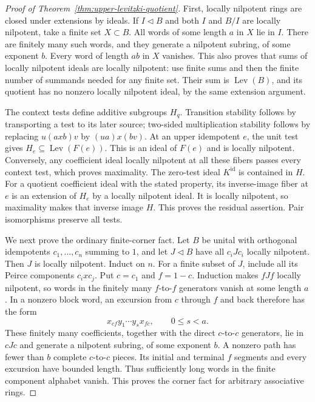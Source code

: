 \begin{proof}[Proof of Theorem~\ref{thm:upper-levitzki-quotient}]
First, locally nilpotent rings are closed under extensions by ideals.
If $I\lhd B$ and both $I$ and $B/I$ are locally nilpotent, take a finite
set $X\subset B$. All words of some length $a$ in $X$ lie in $I$.
There are finitely many such words, and they generate a nilpotent
subring, of some exponent $b$. Every word of length $ab$ in $X$
vanishes. This also proves that sums of locally nilpotent ideals are
locally nilpotent: use finite sums and then the finite number of
summands needed for any finite set. Their sum is
$\operatorname{Lev}(B)$, and its quotient has no nonzero locally
nilpotent ideal, by the same extension argument.

The context tests define additive subgroups $H_q$. Transition
stability follows by transporting a test to its later source;
two-sided multiplication stability follows by replacing
$u(axb)v$ by $(ua)x(bv)$. At an upper idempotent $e$, the unit test
gives $H_e\subseteq\operatorname{Lev}(F(e))$. This is an ideal of
$F(e)$ and is locally nilpotent. Conversely, any coefficient ideal
locally nilpotent at all these fibers passes every context test, which
proves maximality. The zero-test ideal $K^{\mathrm{id}}$ is contained
in $H$. For a quotient coefficient ideal with the stated property,
its inverse-image fiber at $e$ is an extension of $H_e$ by a locally
nilpotent ideal. It is locally nilpotent, so maximality makes that
inverse image $H$. This proves the residual assertion. Pair
isomorphisms preserve all tests.

We next prove the ordinary finite-corner fact. Let $B$ be unital with
orthogonal idempotents $c_1,\ldots,c_n$ summing to $1$, and let
$J\lhd B$ have all $c_iJc_i$ locally nilpotent. Then $J$ is locally
nilpotent. Induct on $n$. For a finite subset of $J$, include all its
Peirce components $c_ixc_j$. Put $c=c_1$ and $f=1-c$. Induction
makes $fJf$ locally nilpotent, so words in the finitely many
$f$-to-$f$ generators vanish at some length $a$. In a nonzero block
word, an excursion from $c$ through $f$ and back therefore has the
form
\[
 x_{cf}y_1\cdots y_sx_{fc},\qquad 0\leq s<a.
\]
These finitely many coefficients, together with the direct
$c$-to-$c$ generators, lie in $cJc$ and generate a nilpotent subring,
of some exponent $b$. A nonzero path has fewer than $b$ complete
$c$-to-$c$ pieces. Its initial and terminal $f$ segments and every
excursion have bounded length. Thus sufficiently long words in the
finite component alphabet vanish. This proves the corner fact for
arbitrary associative rings.


\end{proof}
